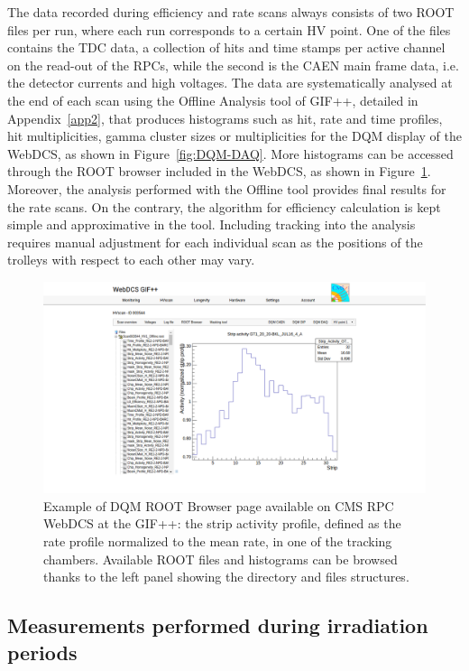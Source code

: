 	The data recorded during efficiency and rate scans always consists of two ROOT files per run, where each run corresponds to a certain HV point. One of the files contains the TDC data, a collection of hits and time stamps per active channel on the read-out of the RPCs, while the second is the CAEN main frame data, i.e. the detector currents and high voltages. The data are systematically analysed at the end of each scan using the Offline Analysis tool of GIF++, detailed in Appendix~\ref{app2}, that produces histograms such as hit, rate and time profiles, hit multiplicities, gamma cluster sizes or multiplicities for the DQM display of the WebDCS, as shown in Figure~\ref{fig:DQM-DAQ}. More histograms can be accessed through the ROOT browser included in the WebDCS, as shown in Figure~\ref{fig:DQM-ROOT}. Moreover, the analysis performed with the Offline tool provides final results for the rate scans. On the contrary, the algorithm for efficiency calculation is kept simple and approximative in the tool. Including tracking into the analysis requires manual adjustment for each individual scan as the positions of the trolleys with respect to each other may vary.

	\begin{figure}[H]
        \centering
		\includegraphics[width = \linewidth]{fig/chapt5/GIFpp-ROOT-browser.png}
		\caption{\label{fig:DQM-ROOT} Example of DQM ROOT Browser page available on CMS RPC WebDCS at the GIF++: the strip activity profile, defined as the rate profile normalized to the mean rate, in one of the tracking chambers. Available ROOT files and histograms can be browsed thanks to the left panel showing the directory and files structures.}
	\end{figure}

	\subsection{Measurements performed during irradiation periods}
	\label{chapt5:ssec:irradiation}
	
